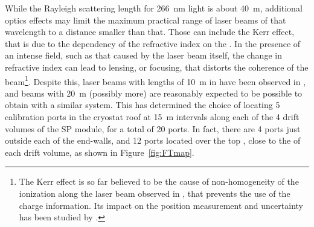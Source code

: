 




While the Rayleigh scattering length for \SI{266}{\nano\m}  light is about \SI{40}{\m}, additional optics effects may limit the maximum practical range of laser beams of that wavelength to a distance smaller than that. Those can include the Kerr effect, that is due to the dependency of the refractive index on the \efield. In the presence of an intense field, such as that caused by the laser beam itself, the change in refractive index can lead to lensing, or focusing, that distorts the coherence of the beam\footnote{The Kerr effect is so far believed to be the cause of non-homogeneity of the ionization along the laser beam observed in , that prevents the use of the charge information. Its impact on the position measurement and \efield uncertainty has been studied by .}. 
Despite this, laser beams with lengths of \SI{10}{\m} in  have been observed in , and beams with \SI{20}{\m} (possibly more) are reasonably expected to be possible to obtain with a similar system.
This has determined the choice of locating \num{5} calibration ports in the cryostat roof at \SI{15}{\m} intervals along each of the \num{4} drift volumes of the SP module, for a total of \num{20} ports. In fact, there are \num{4} ports just outside each of the  end-walls, and \num{12} ports located over the top , close to the  of each drift volume, as shown in Figure~\ref{fig:FTmap}.



